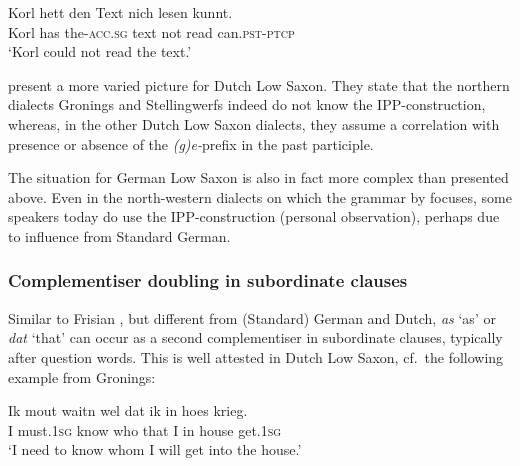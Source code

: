 \documentclass[output=paper,colorlinks,citecolor=brown]{langscibook}
\begin{document}
\ea
\gll Korl                           hett      den      Text      nich    lesen   kunnt.\\
     Korl          has  the-\textsc{acc}.\textsc{sg}    text  not   read can.\textsc{pst}-\textsc{ptcp}\\
\glt`Korl could not read the text.' \citep[108]{LindowEtAl1998}
\z

\citet[66]{BloemhoffEtAl2019} present a more varied picture for Dutch Low Saxon. They state that the northern dialects Gronings and Stellingwerfs indeed do not know the IPP-construction, whereas, in the other Dutch Low Saxon dialects, they assume a correlation with presence or absence of the \textit{(g)e-}prefix in the past participle. 

The situation for German Low Saxon is also in fact more complex than presented above. Even in the north-western dialects on which the grammar by \citet{LindowEtAl1998} focuses, some speakers today do use the IPP-construction (personal observation), perhaps due to influence from Standard German. 


\subsubsection{Complementiser doubling in subordinate clauses}\label{feature:double-complementiser} %
Similar to Frisian \citep[299]{Popkema2018}, but different from (Standard) German and Dutch, \textit{as} `as' or \textit{dat} `that' can occur as a second complementiser in subordinate clauses,  typically after question words.  This is well attested in Dutch Low Saxon, cf.~the following example from Gronings: 

\ea
 \gll  Ik    mout    waitn   wel   dat   ik   in   hoes   krieg. \\
     I      must.\textsc{1sg}  know  who  that    I    in   house   get.\textsc{1sg}\\
\glt `I need to know whom I will get into the house.' \citep[114]{vanBree2008}
\z


\end{document}
